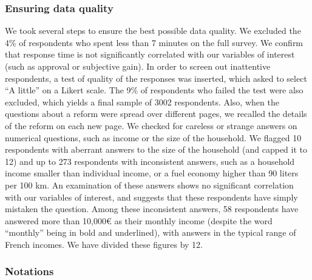 \documentclass[11pt]{article}
\begin{document}
\subsubsection{Ensuring data quality}

We took several steps to ensure the best possible data quality. We excluded the 4\% of respondents who spent less than 7 minutes on the full survey. We confirm that response time is not significantly correlated with our variables of interest (such as approval or subjective gain). In order to screen out inattentive respondents, a test of quality of the responses was inserted, which asked to select ``A little'' on a Likert scale. The 9\% of respondents who failed the test were also excluded, which yields a final sample of 3002 respondents. Also, when the questions about a reform were spread over different pages, we recalled the details of the reform on each new page. We checked for careless or strange answers on numerical questions, such as income or the size of the household. We flagged 10 respondents with aberrant answers to the size of the household (and capped it to 12) and up to 273 respondents with inconsistent answers, such as a household income smaller than individual income, or a fuel economy higher than 90 liters per 100 km. An examination of these answers shows no significant correlation with our variables of interest, and suggests that these respondents have simply mistaken the question. Among these inconsistent answers, 58 respondents have answered more than 10,000\euro{} as their monthly income (despite the word ``monthly'' being in bold and underlined), with answers in the typical range of French incomes. We have divided these figures by 12.

\subsubsection{Notations}
\end{document}
